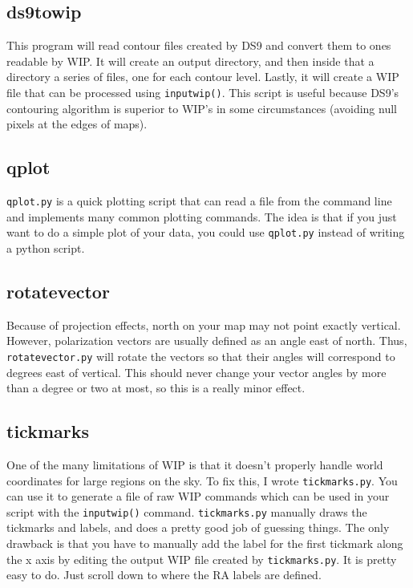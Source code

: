 \documentclass[12pt]{article}
\begin{document}
\subsection{ds9towip}

This program will read contour files created by DS9 and convert them to
ones readable by WIP.  It will create an output directory, and then inside
that a directory a series of files, one for each contour level.  Lastly, it
will create a WIP file that can be processed using \texttt{inputwip()}.  This
script is useful because DS9's contouring algorithm is superior to WIP's in
some circumstances (avoiding null pixels at the edges of maps).

\subsection{qplot}

\texttt{qplot.py} is a quick plotting script that can read a file from the
command line and implements many common plotting commands.  The idea is that if
you just want to do a simple plot of your data, you could use \texttt{qplot.py}
instead of writing a python script.

\subsection{rotatevector}

Because of projection effects, north on your map may not point exactly vertical.
However, polarization vectors are usually defined as an angle east of north.
Thus, \texttt{rotatevector.py} will rotate the vectors so that their angles
will correspond to degrees east of vertical.  This should never change your
vector angles by more than a degree or two at most, so this is a really minor
effect.

\subsection{tickmarks}

One of the many limitations of WIP is that it doesn't properly handle world
coordinates for large regions on the sky.  To fix this, I wrote
\texttt{tickmarks.py}. You can use it to generate a file of raw WIP commands
which can be used in your script with the \texttt{inputwip()} command.
\texttt{tickmarks.py} manually draws the tickmarks and labels, and does a pretty
good job of guessing things.  The only drawback is that you have to manually
add the label for the first tickmark along the x axis by editing the output
WIP file created by \texttt{tickmarks.py}.  It is pretty easy to do.  Just
scroll down to where the RA labels are defined.
\end{document}
